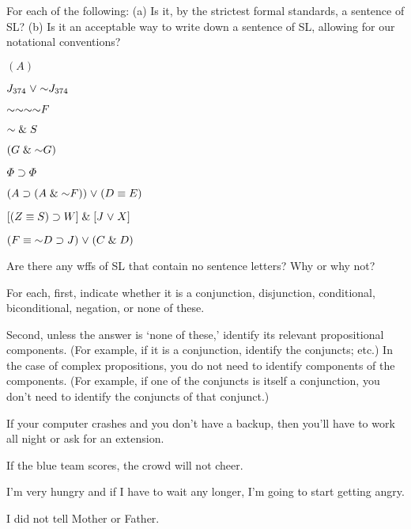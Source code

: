 \solutions
\problempart
\label{pr.wiffSL}
For each of the following: (a) Is it, by the strictest formal standards, a sentence of SL? (b) Is it an acceptable way to write down a sentence of SL, allowing for our notational conventions?
\begin{earg}
\item $(A)$
\item $J_{374} \eor \enot J_{374}$
\item $\enot \enot \enot \enot F$
\item $\enot \eand S$
\item $(G \eand \enot G)$
\item $\varPhi{} \supset \varPhi{}$
\item $(A \eif (A \eand \enot F)) \eor (D \eiff E)$
\item $[(Z \equiv S) \supset W] \mathrel\& [J \mkern1mu\vee\mkern1mu X]$
\item $(F \eiff \enot D \eif J) \eor (C \eand D)$
\end{earg}



\problempart
\begin{earg}
\item Are there any wffs of SL that contain no sentence letters? Why or why not?
\end{earg}

\problempart
\label{HW2.B}
For each, first, indicate whether it is a conjunction, disjunction, conditional, biconditional, negation, or none of these.

Second, unless the answer is ‘none of these,’ identify its relevant propositional components. (For example, if it is a conjunction, identify the conjuncts; etc.) In the case of complex propositions, you do not need to identify components of the components. (For example, if one of the conjuncts is itself a conjunction, you don’t need to identify the conjuncts of that conjunct.)

	\begin{earg}
		\item If your computer crashes and you don’t have a backup, then you’ll have to work all night or ask for an extension.
		\item If the blue team scores, the crowd will not cheer.
		\item I’m very hungry and if I have to wait any longer, I’m going to start getting angry.
		\item I did not tell Mother or Father.
	\end{earg}
	
